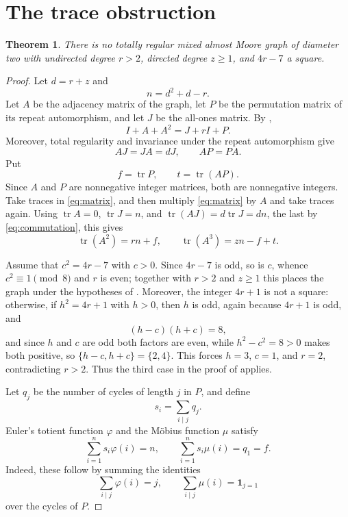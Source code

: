 \documentclass[11pt]{amsart}
\newtheorem{theorem}{Theorem}
\DeclareMathOperator{\tr}{tr}
\begin{document}
\section{The trace obstruction}

\begin{theorem}\label{thm:main}
There is no totally regular mixed almost Moore graph of diameter two
with undirected degree $r>2$, directed degree $z\geq 1$, and $4r-7$
a square.
\end{theorem}

\begin{proof}
Let $d=r+z$ and
\[
  n=d^2+d-r.
\]
Let $A$ be the adjacency matrix of the graph, let $P$ be the
permutation matrix of its repeat automorphism, and let $J$ be the
all-ones matrix. By \cite[Eq.~(1)]{LM},
\begin{equation}\label{eq:matrix}
  I+A+A^2=J+rI+P.
\end{equation}
Moreover, total regularity and invariance under the repeat
automorphism give
\begin{equation}\label{eq:commutation}
  AJ=JA=dJ,
  \qquad
  AP=PA.
\end{equation}
Put
\[
  f=\tr P,
  \qquad
  t=\tr(AP).
\]
Since $A$ and $P$ are nonnegative integer matrices, both are
nonnegative integers. Take traces in \eqref{eq:matrix}, and then
multiply \eqref{eq:matrix} by $A$ and take traces again. Using
$\tr A=0$, $\tr J=n$, and $\tr(AJ)=d\tr J=dn$, the last by
\eqref{eq:commutation}, this gives
\begin{equation}\label{eq:combinatorial-traces}
  \tr(A^2)=rn+f,
  \qquad
  \tr(A^3)=zn-f+t.
\end{equation}

Assume that $c^2=4r-7$ with $c>0$. Since $4r-7$ is odd, so is $c$,
whence $c^2\equiv1\pmod 8$ and
$r$ is even; together with $r>2$ and $z\geq 1$ this places the
graph under the hypotheses of \cite[Theorem~2]{LM}. Moreover, the
integer $4r+1$ is not a square: otherwise, if $h^2=4r+1$ with $h>0$,
then $h$ is odd, again because $4r+1$ is odd, and
\[
  (h-c)(h+c)=8,
\]
and since $h$ and $c$ are odd both factors are even, while
$h^2-c^2=8>0$ makes both positive, so $\{h-c,h+c\}=\{2,4\}$. This
forces $h=3$, $c=1$, and $r=2$, contradicting $r>2$. Thus the third
case in the proof of \cite[Theorem~2]{LM} applies.

Let $q_j$ be the number of cycles of length $j$ in $P$, and define
\[
  s_i=\sum_{i\mid j}q_j.
\]
Euler's totient function $\varphi$ and the M\"obius function $\mu$
satisfy
\begin{equation}\label{eq:mobius-identities}
  \sum_{i=1}^{n}s_i\varphi(i)=n,
  \qquad
  \sum_{i=1}^{n}s_i\mu(i)=q_1=f.
\end{equation}
Indeed, these follow by summing the identities
\[
  \sum_{i\mid j}\varphi(i)=j,
  \qquad
  \sum_{i\mid j}\mu(i)=\mathbf{1}_{j=1}
\]
over the cycles of $P$.


\end{proof}
\end{document}
